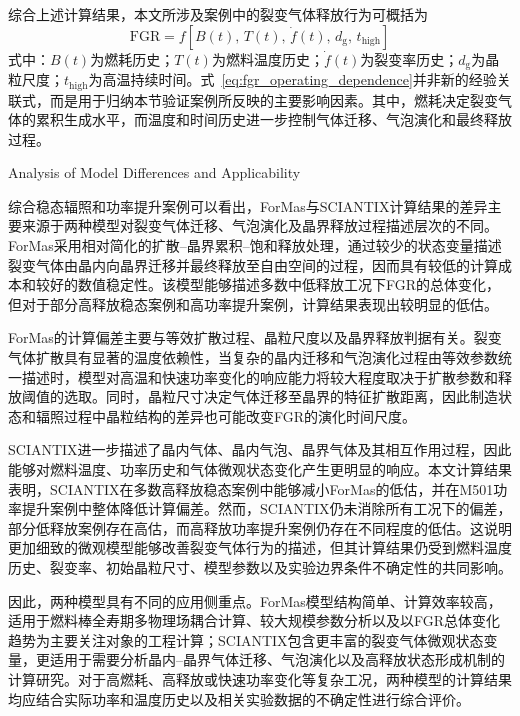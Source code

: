 综合上述计算结果，本文所涉及案例中的裂变气体释放行为可概括为
\begin{equation}
	\mathrm{FGR}
	=
	f\left[
	B(t),\,
	T(t),\,
	\dot{f}(t),\,
	d_{\mathrm{g}},\,
	t_{\mathrm{high}}
	\right]
	\label{eq:fgr_operating_dependence}
\end{equation}
\noindent 式中：$B(t)$为燃耗历史；$T(t)$为燃料温度历史；$\dot{f}(t)$为裂变率历史；$d_{\mathrm{g}}$为晶粒尺度；$t_{\mathrm{high}}$为高温持续时间。式~\eqref{eq:fgr_operating_dependence}并非新的经验关联式，而是用于归纳本节验证案例所反映的主要影响因素。其中，燃耗决定裂变气体的累积生成水平，而温度和时间历史进一步控制气体迁移、气泡演化和最终释放过程。

{Analysis of Model Differences and Applicability}

综合稳态辐照和功率提升案例可以看出，ForMas与SCIANTIX计算结果的差异主要来源于两种模型对裂变气体迁移、气泡演化及晶界释放过程描述层次的不同。ForMas采用相对简化的扩散--晶界累积--饱和释放处理，通过较少的状态变量描述裂变气体由晶内向晶界迁移并最终释放至自由空间的过程，因而具有较低的计算成本和较好的数值稳定性。该模型能够描述多数中低释放工况下FGR的总体变化，但对于部分高释放稳态案例和高功率提升案例，计算结果表现出较明显的低估。

ForMas的计算偏差主要与等效扩散过程、晶粒尺度以及晶界释放判据有关。裂变气体扩散具有显著的温度依赖性，当复杂的晶内迁移和气泡演化过程由等效参数统一描述时，模型对高温和快速功率变化的响应能力将较大程度取决于扩散参数和释放阈值的选取。同时，晶粒尺寸决定气体迁移至晶界的特征扩散距离，因此制造状态和辐照过程中晶粒结构的差异也可能改变FGR的演化时间尺度。

SCIANTIX进一步描述了晶内气体、晶内气泡、晶界气体及其相互作用过程，因此能够对燃料温度、功率历史和气体微观状态变化产生更明显的响应。本文计算结果表明，SCIANTIX在多数高释放稳态案例中能够减小ForMas的低估，并在M501功率提升案例中整体降低计算偏差。然而，SCIANTIX仍未消除所有工况下的偏差，部分低释放案例存在高估，而高释放功率提升案例仍存在不同程度的低估。这说明更加细致的微观模型能够改善裂变气体行为的描述，但其计算结果仍受到燃料温度历史、裂变率、初始晶粒尺寸、模型参数以及实验边界条件不确定性的共同影响。

因此，两种模型具有不同的应用侧重点。ForMas模型结构简单、计算效率较高，适用于燃料棒全寿期多物理场耦合计算、较大规模参数分析以及以FGR总体变化趋势为主要关注对象的工程计算；SCIANTIX包含更丰富的裂变气体微观状态变量，更适用于需要分析晶内--晶界气体迁移、气泡演化以及高释放状态形成机制的计算研究。对于高燃耗、高释放或快速功率变化等复杂工况，两种模型的计算结果均应结合实际功率和温度历史以及相关实验数据的不确定性进行综合评价。

